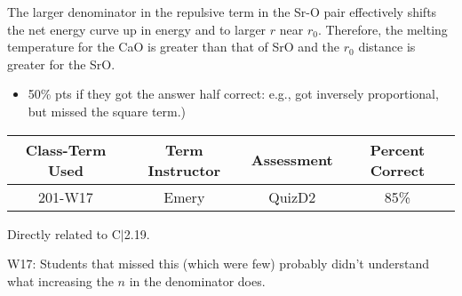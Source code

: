 \begin{solution}

The larger denominator in the repulsive term in the Sr-O pair effectively shifts the net energy curve up in energy and to larger $r$ near $r_0$. Therefore, the melting temperature for the CaO is greater than that of SrO and the $r_0$ distance is greater for the SrO. 
	
\end{solution}

\begin{rubric}

\begin{itemize}
	\item 50\% pts if they got the answer half correct: e.g., got inversely proportional, but missed the square term.)
\end{itemize}

\end{rubric}

\begin{outcomes}
	\begin{center}
		\begin{tabular}{cccc}
			\hline\hline
			Class-Term Used & Term Instructor & Assessment & Percent Correct\\
			\hline
			201-W17 & Emery & QuizD2 & 85\%\\    %
			\hline
		\end{tabular}
	\end{center}
\end{outcomes}

\begin{comments}

Directly related to C$|$2.19.

W17: Students that missed this (which were few) probably didn't understand what increasing the $n$ in the denominator does.
	
\end{comments}
